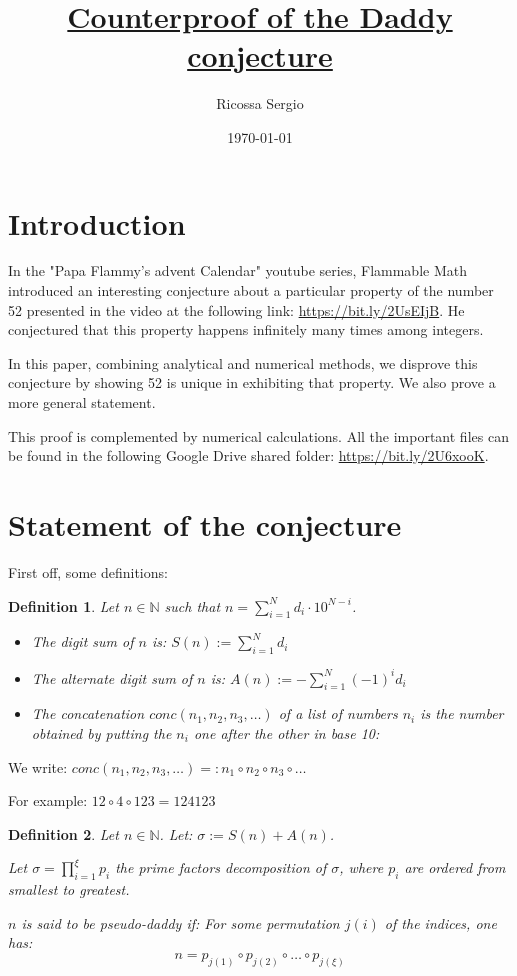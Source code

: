\documentclass[a4paper, 11pt]{report}
\date{\Large{ \today}}
\author{\Large{Ricossa Sergio}}
\newtheorem{definition}{Definition}
\begin{document}
\title{\Huge{\underline{Counterproof of the Daddy conjecture}}}

\maketitle
\thispagestyle{fancy}
\newpage
\section{Introduction}
	In the "Papa Flammy's advent Calendar" youtube series, Flammable Math introduced an interesting conjecture about a particular property of the number 52 presented in the video at the following link: \url{https://bit.ly/2UsEIjB}. He conjectured that this property happens infinitely many times among integers.
	
	In this paper, combining analytical and numerical methods, we disprove this conjecture by showing 52 is unique in exhibiting that property. We also prove a more general statement.
	
	This proof is complemented by numerical calculations. All the important files can be found in the following Google Drive shared folder: \url{https://bit.ly/2U6xooK}.

\section{Statement of the conjecture}

	First off, some definitions:
	\begin{definition}
		Let $n\in\mathbb{N}$ such that $n = \sum_{i=1}^Nd_i\cdot10^{N-i}$.
		
		\begin{itemize}
			\item The \emph{digit sum} of $n$ is: $S(n):=\sum_{i=1}^Nd_i$
			\item The \emph{alternate digit sum} of $n$ is: $A(n):=-\sum_{i=1}^N(-1)^id_i$
			\item The \emph{concatenation} $conc(n_1,n_2,n_3,\dots)$ of a list of numbers $n_i$ is the number obtained by putting the $n_i$ one after the other in base 10:
		\end{itemize}
	\end{definition}

	We write: $conc(n_1,n_2,n_3,\dots) =: n_1\circ n_2\circ n_3\circ\dots$
			
	For example: $12\circ4\circ123=124123$
	
	\begin{definition}
		Let $n\in\mathbb{N}$. Let: $\sigma:=S(n)+A(n)$. 
		
		Let $\sigma=\prod_{i=1}^\xi p_i$ the prime factors decomposition of $\sigma$, where $p_i$ are ordered from smallest to greatest.
		
		$n$ is said to be \emph{pseudo-daddy} if:
		For some permutation $j(i)$ of the indices, one has:
		$$n=p_{j(1)}\circ p_{j(2)}\circ\dots\circ p_{j(\xi)}$$
		
	\end{definition}
	
\end{document}
